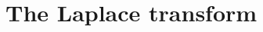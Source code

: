 \chapter{The Laplace transform} \label{LT:chapter}
\renewcommand{\thesection}{\thechapter.\the\value{section}}






\sectionnewpage




\sectionnewpage




\sectionnewpage




\sectionnewpage



